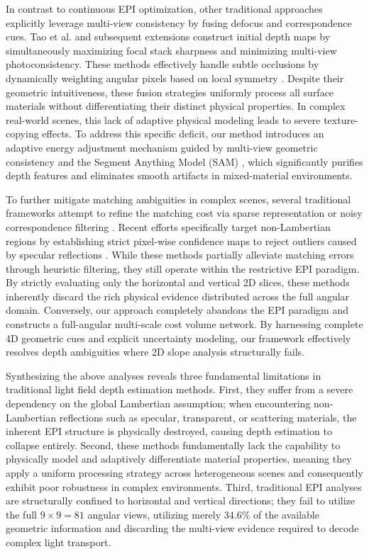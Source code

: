 \documentclass[lettersize,journal]{IEEEtran}
\begin{document}
In contrast to continuous EPI optimization, other traditional approaches explicitly leverage multi-view consistency by fusing defocus and correspondence cues. Tao et al. \cite{tao2013} and subsequent extensions \cite{chen2017} construct initial depth maps by simultaneously maximizing focal stack sharpness and minimizing multi-view photoconsistency. These methods effectively handle subtle occlusions by dynamically weighting angular pixels based on local symmetry \cite{wang2015}. Despite their geometric intuitiveness, these fusion strategies uniformly process all surface materials without differentiating their distinct physical properties. In complex real-world scenes, this lack of adaptive physical modeling leads to severe texture-copying effects. To address this specific deficit, our method introduces an adaptive energy adjustment mechanism guided by multi-view geometric consistency and the Segment Anything Model (SAM) \cite{kirillov2023}, which significantly purifies depth features and eliminates smooth artifacts in mixed-material environments.

To further mitigate matching ambiguities in complex scenes, several traditional frameworks attempt to refine the matching cost via sparse representation or noisy correspondence filtering \cite{wang2023}. Recent efforts specifically target non-Lambertian regions by establishing strict pixel-wise confidence maps to reject outliers caused by specular reflections \cite{li2021, zhang2023}. While these methods partially alleviate matching errors through heuristic filtering, they still operate within the restrictive EPI paradigm. By strictly evaluating only the horizontal and vertical 2D slices, these methods inherently discard the rich physical evidence distributed across the full angular domain. Conversely, our approach completely abandons the EPI paradigm and constructs a full-angular multi-scale cost volume network. By harnessing complete 4D geometric cues and explicit uncertainty modeling, our framework effectively resolves depth ambiguities where 2D slope analysis structurally fails.

Synthesizing the above analyses reveals three fundamental limitations in traditional light field depth estimation methods. First, they suffer from a severe dependency on the global Lambertian assumption; when encountering non-Lambertian reflections such as specular, transparent, or scattering materials, the inherent EPI structure is physically destroyed, causing depth estimation to collapse entirely. Second, these methods fundamentally lack the capability to physically model and adaptively differentiate material properties, meaning they apply a uniform processing strategy across heterogeneous scenes and consequently exhibit poor robustness in complex environments. Third, traditional EPI analyses are structurally confined to horizontal and vertical directions; they fail to utilize the full $9 \times 9 = 81$ angular views, utilizing merely $34.6\%$ of the available geometric information and discarding the multi-view evidence required to decode complex light transport.
\end{document}
